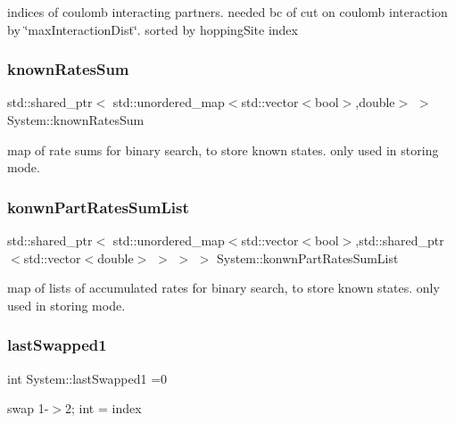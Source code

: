 indices of coulomb interacting partners. needed bc of cut on coulomb interaction by \char`\"{}max\+Interaction\+Dist\char`\"{}. sorted by hopping\+Site index \mbox{\label{classSystem_af23703acd38834ecb9381425724f4ca5}} 
\subsubsection{\texorpdfstring{known\+Rates\+Sum}{knownRatesSum}}
{\footnotesize\ttfamily std\+::shared\+\_\+ptr$<$ std\+::unordered\+\_\+map$<$std\+::vector$<$bool$>$,double$>$ $>$ System\+::known\+Rates\+Sum\hspace{0.3cm}{\ttfamily [private]}}

map of rate sums for binary search, to store known states. only used in storing mode. \mbox{\label{classSystem_a9892a3f67a51872cce3577ec50a55a5d}} 
\subsubsection{\texorpdfstring{konwn\+Part\+Rates\+Sum\+List}{konwnPartRatesSumList}}
{\footnotesize\ttfamily std\+::shared\+\_\+ptr$<$ std\+::unordered\+\_\+map$<$std\+::vector$<$bool$>$,std\+::shared\+\_\+ptr$<$std\+::vector$<$double$>$ $>$ $>$ $>$ System\+::konwn\+Part\+Rates\+Sum\+List\hspace{0.3cm}{\ttfamily [private]}}

map of lists of accumulated rates for binary search, to store known states. only used in storing mode. \mbox{\label{classSystem_a6cae5a9a0157f7e6042bda0807879568}} 
\subsubsection{\texorpdfstring{last\+Swapped1}{lastSwapped1}}
{\footnotesize\ttfamily int System\+::last\+Swapped1 =0\hspace{0.3cm}{\ttfamily [private]}}

swap 1-\/$>$2; int = index \mbox{\label{classSystem_a6ddf57bedba9389eb75ffb60cad1391c}} 
